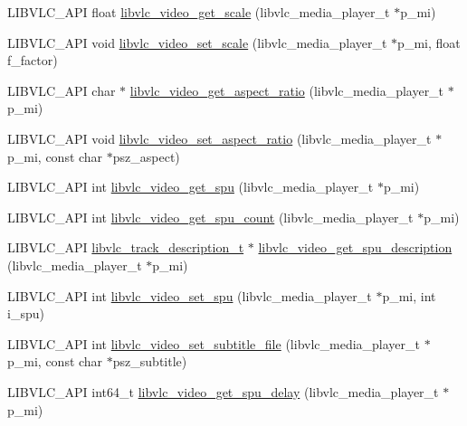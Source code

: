 \begin{DoxyCompactItemize}
\item 
L\+I\+B\+V\+L\+C\+\_\+\+A\+PI float \hyperlink{group__libvlc__video_gaae1c4a4dafeb09d7b9f2ab29fcedc0f8}{libvlc\+\_\+video\+\_\+get\+\_\+scale} (libvlc\+\_\+media\+\_\+player\+\_\+t $\ast$p\+\_\+mi)
\item 
L\+I\+B\+V\+L\+C\+\_\+\+A\+PI void \hyperlink{group__libvlc__video_ga36dfdf93272e1085d9183394c8aef1be}{libvlc\+\_\+video\+\_\+set\+\_\+scale} (libvlc\+\_\+media\+\_\+player\+\_\+t $\ast$p\+\_\+mi, float f\+\_\+factor)
\item 
L\+I\+B\+V\+L\+C\+\_\+\+A\+PI char $\ast$ \hyperlink{group__libvlc__video_ga058fe83cdecb2c66d075372416f233f8}{libvlc\+\_\+video\+\_\+get\+\_\+aspect\+\_\+ratio} (libvlc\+\_\+media\+\_\+player\+\_\+t $\ast$p\+\_\+mi)
\item 
L\+I\+B\+V\+L\+C\+\_\+\+A\+PI void \hyperlink{group__libvlc__video_ga07d2e26cfe070757339ba03927afec8a}{libvlc\+\_\+video\+\_\+set\+\_\+aspect\+\_\+ratio} (libvlc\+\_\+media\+\_\+player\+\_\+t $\ast$p\+\_\+mi, const char $\ast$psz\+\_\+aspect)
\item 
L\+I\+B\+V\+L\+C\+\_\+\+A\+PI int \hyperlink{group__libvlc__video_gad7d344e90d3a890847f3a3a51ba8df5c}{libvlc\+\_\+video\+\_\+get\+\_\+spu} (libvlc\+\_\+media\+\_\+player\+\_\+t $\ast$p\+\_\+mi)
\item 
L\+I\+B\+V\+L\+C\+\_\+\+A\+PI int \hyperlink{group__libvlc__video_gaa7395490da642312f498e745c24c3f2f}{libvlc\+\_\+video\+\_\+get\+\_\+spu\+\_\+count} (libvlc\+\_\+media\+\_\+player\+\_\+t $\ast$p\+\_\+mi)
\item 
L\+I\+B\+V\+L\+C\+\_\+\+A\+PI \hyperlink{structlibvlc__track__description__t}{libvlc\+\_\+track\+\_\+description\+\_\+t} $\ast$ \hyperlink{group__libvlc__video_ga3edaa14e1cb0b80edc1636319ab05cf7}{libvlc\+\_\+video\+\_\+get\+\_\+spu\+\_\+description} (libvlc\+\_\+media\+\_\+player\+\_\+t $\ast$p\+\_\+mi)
\item 
L\+I\+B\+V\+L\+C\+\_\+\+A\+PI int \hyperlink{group__libvlc__video_gac0594ad8db60a38a19eca5858f087e9d}{libvlc\+\_\+video\+\_\+set\+\_\+spu} (libvlc\+\_\+media\+\_\+player\+\_\+t $\ast$p\+\_\+mi, int i\+\_\+spu)
\item 
L\+I\+B\+V\+L\+C\+\_\+\+A\+PI int \hyperlink{group__libvlc__video_ga91d4f34cfedc53a90e3732b539b6c88f}{libvlc\+\_\+video\+\_\+set\+\_\+subtitle\+\_\+file} (libvlc\+\_\+media\+\_\+player\+\_\+t $\ast$p\+\_\+mi, const char $\ast$psz\+\_\+subtitle)
\item 
L\+I\+B\+V\+L\+C\+\_\+\+A\+PI int64\+\_\+t \hyperlink{group__libvlc__video_ga5302f641bc51d3e2169678f8c242c1b0}{libvlc\+\_\+video\+\_\+get\+\_\+spu\+\_\+delay} (libvlc\+\_\+media\+\_\+player\+\_\+t $\ast$p\+\_\+mi)

\end{DoxyCompactItemize}
